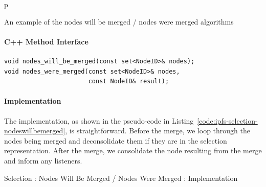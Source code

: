 \begin{stusubfig}{p}
	\hspace{4mm}%
	\hspace{4mm}%
\caption{An example of the nodes will be merged / nodes were merged algorithms}
\label{fig:ipfs-selection-nodeswillbemerged}
\end{stusubfig}

\paragraph{C++ Method Interface}

\begin{lstlisting}[style=Prototype]
void nodes_will_be_merged(const set<NodeID>& nodes);
void nodes_were_merged(const set<NodeID>& nodes,
                       const NodeID& result);
\end{lstlisting}

\paragraph{Implementation}

The implementation, as shown in the pseudo-code in Listing~\ref{code:ipfs-selection-nodeswillbemerged}, is straightforward. Before the merge, we loop through the nodes being merged and deconsolidate them if they are in the selection representation. After the merge, we consolidate the node resulting from the merge and inform any listeners.

\begin{stulisting}[p]
\caption{Selection : Nodes Will Be Merged / Nodes Were Merged : Implementation}
\label{code:ipfs-selection-nodeswillbemerged}

\end{stulisting}

